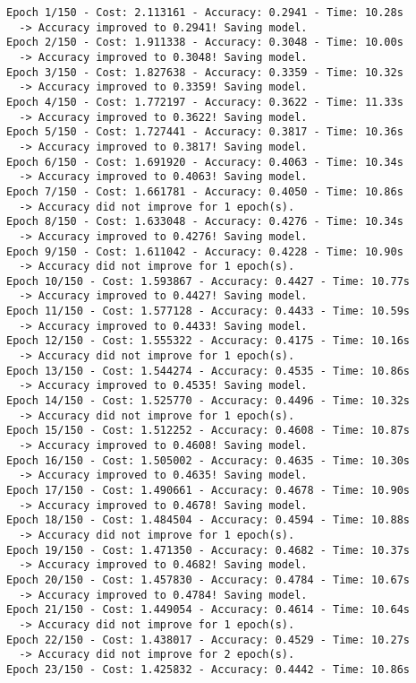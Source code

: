 \documentclass[11pt]{article}
\begin{document}
    \begin{Verbatim}[commandchars=\\\{\}]
Epoch 1/150 - Cost: 2.113161 - Accuracy: 0.2941 - Time: 10.28s
  -> Accuracy improved to 0.2941! Saving model.
Epoch 2/150 - Cost: 1.911338 - Accuracy: 0.3048 - Time: 10.00s
  -> Accuracy improved to 0.3048! Saving model.
Epoch 3/150 - Cost: 1.827638 - Accuracy: 0.3359 - Time: 10.32s
  -> Accuracy improved to 0.3359! Saving model.
Epoch 4/150 - Cost: 1.772197 - Accuracy: 0.3622 - Time: 11.33s
  -> Accuracy improved to 0.3622! Saving model.
Epoch 5/150 - Cost: 1.727441 - Accuracy: 0.3817 - Time: 10.36s
  -> Accuracy improved to 0.3817! Saving model.
Epoch 6/150 - Cost: 1.691920 - Accuracy: 0.4063 - Time: 10.34s
  -> Accuracy improved to 0.4063! Saving model.
Epoch 7/150 - Cost: 1.661781 - Accuracy: 0.4050 - Time: 10.86s
  -> Accuracy did not improve for 1 epoch(s).
Epoch 8/150 - Cost: 1.633048 - Accuracy: 0.4276 - Time: 10.34s
  -> Accuracy improved to 0.4276! Saving model.
Epoch 9/150 - Cost: 1.611042 - Accuracy: 0.4228 - Time: 10.90s
  -> Accuracy did not improve for 1 epoch(s).
Epoch 10/150 - Cost: 1.593867 - Accuracy: 0.4427 - Time: 10.77s
  -> Accuracy improved to 0.4427! Saving model.
Epoch 11/150 - Cost: 1.577128 - Accuracy: 0.4433 - Time: 10.59s
  -> Accuracy improved to 0.4433! Saving model.
Epoch 12/150 - Cost: 1.555322 - Accuracy: 0.4175 - Time: 10.16s
  -> Accuracy did not improve for 1 epoch(s).
Epoch 13/150 - Cost: 1.544274 - Accuracy: 0.4535 - Time: 10.86s
  -> Accuracy improved to 0.4535! Saving model.
Epoch 14/150 - Cost: 1.525770 - Accuracy: 0.4496 - Time: 10.32s
  -> Accuracy did not improve for 1 epoch(s).
Epoch 15/150 - Cost: 1.512252 - Accuracy: 0.4608 - Time: 10.87s
  -> Accuracy improved to 0.4608! Saving model.
Epoch 16/150 - Cost: 1.505002 - Accuracy: 0.4635 - Time: 10.30s
  -> Accuracy improved to 0.4635! Saving model.
Epoch 17/150 - Cost: 1.490661 - Accuracy: 0.4678 - Time: 10.90s
  -> Accuracy improved to 0.4678! Saving model.
Epoch 18/150 - Cost: 1.484504 - Accuracy: 0.4594 - Time: 10.88s
  -> Accuracy did not improve for 1 epoch(s).
Epoch 19/150 - Cost: 1.471350 - Accuracy: 0.4682 - Time: 10.37s
  -> Accuracy improved to 0.4682! Saving model.
Epoch 20/150 - Cost: 1.457830 - Accuracy: 0.4784 - Time: 10.67s
  -> Accuracy improved to 0.4784! Saving model.
Epoch 21/150 - Cost: 1.449054 - Accuracy: 0.4614 - Time: 10.64s
  -> Accuracy did not improve for 1 epoch(s).
Epoch 22/150 - Cost: 1.438017 - Accuracy: 0.4529 - Time: 10.27s
  -> Accuracy did not improve for 2 epoch(s).
Epoch 23/150 - Cost: 1.425832 - Accuracy: 0.4442 - Time: 10.86s

\end{Verbatim}
\end{document}
